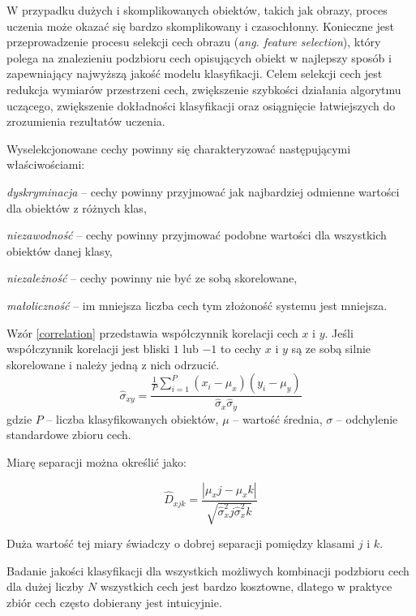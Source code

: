 W przypadku dużych i skomplikowanych obiektów, takich jak obrazy, proces uczenia może okazać się bardzo skomplikowany i czasochłonny. Konieczne jest przeprowadzenie procesu selekcji cech obrazu (\emph{ang. feature selection}), który polega na znalezieniu podzbioru cech opisujących obiekt w najlepszy sposób i zapewniający najwyższą jakość modelu klasyfikacji. Celem selekcji cech jest redukcja wymiarów przestrzeni cech, zwiększenie szybkości działania algorytmu uczącego, zwiększenie dokładności klasyfikacji oraz osiągnięcie łatwiejszych do zrozumienia rezultatów uczenia.\cite{MOTODA98}

Wyselekcjonowane cechy powinny się charakteryzować następującymi właściwościami\cite{STRUMIL}:

\begin{compactitem}
	\item \emph{dyskryminacja} -- cechy powinny przyjmować jak najbardziej odmienne wartości dla obiektów z różnych klas,
	\item \emph{niezawodność} -- cechy powinny przyjmować podobne wartości dla wszystkich obiektów danej klasy,
	\item \emph{niezależność} -- cechy powinny nie być ze sobą skorelowane,
	\item \emph{małoliczność} -- im mniejsza liczba cech tym złożoność systemu jest mniejsza.
\end{compactitem}

Wzór \ref{correlation} przedstawia współczynnik korelacji cech $x$ i $y$. Jeśli współczynnik korelacji jest bliski $1$ lub $-1$ to cechy $x$ i $y$ są ze sobą silnie skorelowane i należy jedną z nich odrzucić.
\begin{equation} 
\label{correlation} 
\hat{\sigma}_{xy}= \frac{\frac{1}{P}\sum\limits_{i=1}^P(x_i-\mu_x)(y_i-\mu_y)}{ \hat{\sigma}_x\hat{\sigma}_y }
\end{equation} gdzie $P$ -- liczba klasyfikowanych obiektów, $\mu$ -- wartość średnia, $\sigma$ -- odchylenie standardowe zbioru cech.

Miarę separacji można określić jako:

\begin{equation}
	\hat{D}_{xjk} = \frac{|\mu_xj - \mu_xk|}{\sqrt{\hat{\sigma}^2_xj \hat{\sigma}^2_xk}}
\end{equation}

Duża wartość tej miary świadczy o dobrej separacji pomiędzy klasami $j$ i $k$.

Badanie jakości klasyfikacji dla wszystkich możliwych kombinacji podzbioru cech dla dużej liczby $N$ wszystkich cech jest bardzo kosztowne, dlatego w praktyce zbiór cech często dobierany jest intuicyjnie.\cite{STRUMIL}

